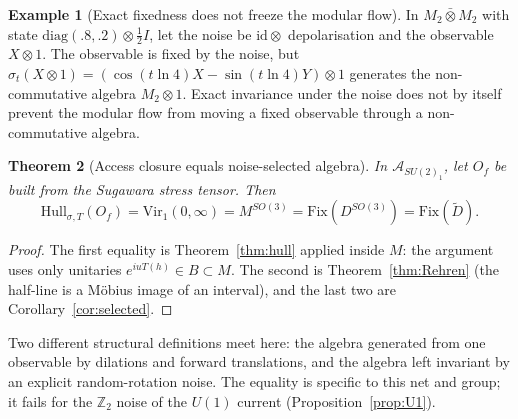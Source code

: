 \documentclass[12pt]{article}
\newtheorem{theorem}{Theorem}[section]
\theoremstyle{definition}
\newtheorem{example}[theorem]{Example}
\theoremstyle{remark}
\begin{document}
\begin{example}[Exact fixedness does not freeze the modular flow]
In \(M_2\bar\otimes M_2\) with state \(\mathrm{diag}(.8,.2)\otimes\tfrac12 I\), let the
noise be \(\mathrm{id}\otimes\) depolarisation and the observable \(X\otimes1\). The
observable is fixed by the noise, but \(\sigma_t(X\otimes1)=(\cos(t\ln4)X-\sin(t\ln4)Y)\otimes1\)
generates the non-commutative algebra \(M_2\otimes1\). Exact invariance under the noise
does not by itself prevent the modular flow from moving a fixed observable through a
non-commutative algebra.
\end{example}

\begin{theorem}[Access closure equals noise-selected algebra]\label{thm:main}
In \(\mathcal A_{SU(2)_1}\), let \(O_f\) be built from the Sugawara stress tensor. Then
\[
\mathrm{Hull}_{\sigma,T}(O_f)=\mathrm{Vir}_1(0,\infty)=M^{SO(3)}=\mathrm{Fix}(D^{SO(3)})=\mathrm{Fix}(\tilde D).
\]
\end{theorem}
\begin{proof}
The first equality is Theorem~\ref{thm:hull} applied inside \(M\): the argument
uses only unitaries \(e^{iuT(h)}\in B\subset M\). The second is Theorem~\ref{thm:Rehren}
(the half-line is a M\"obius image of an interval), and the last two are
Corollary~\ref{cor:selected}.
\end{proof}
Two different structural definitions meet here: the algebra generated from one
observable by dilations and forward translations, and the algebra left invariant by an
explicit random-rotation noise. The equality is specific to this net and group; it
fails for the \(\mathbb Z_2\) noise of the \(U(1)\) current
(Proposition~\ref{prop:U1}).
\end{document}

